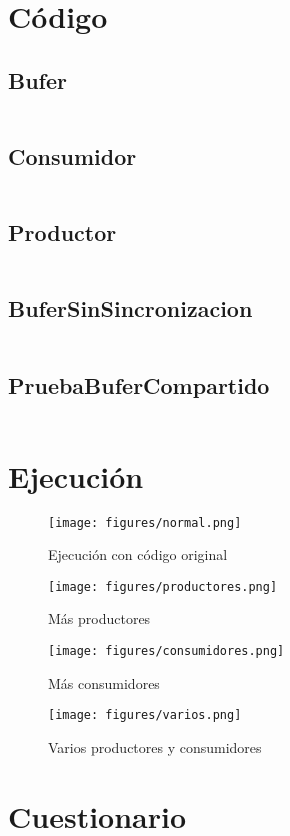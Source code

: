 \documentclass[12pt]{article}
\begin{document}
\section*{Código}

\subsection*{Bufer}
\inputminted{Java}{Bufer.java}
\subsection*{Consumidor}
\inputminted{Java}{Consumidor.java}
\subsection*{Productor}
\inputminted{Java}{Productor.java}
\subsection*{BuferSinSincronizacion}
\inputminted{Java}{BuferSinSincronizacion.java}
\subsection*{PruebaBuferCompartido}
\inputminted{Java}{PruebaBuferCompartido.java}

\section*{Ejecución}

\begin{figure}[H]
  \centering
  \texttt{[image: figures/normal.png]}
  \caption{Ejecución con código original}
\end{figure}
\begin{figure}[H]
  \centering
  \texttt{[image: figures/productores.png]}
  \caption{Más productores}
\end{figure}
\begin{figure}[H]
  \centering
  \texttt{[image: figures/consumidores.png]}
  \caption{Más consumidores}
\end{figure}
\begin{figure}[H]
  \centering
  \texttt{[image: figures/varios.png]}
  \caption{Varios productores y consumidores}
\end{figure}

\section*{Cuestionario}
\end{document}
